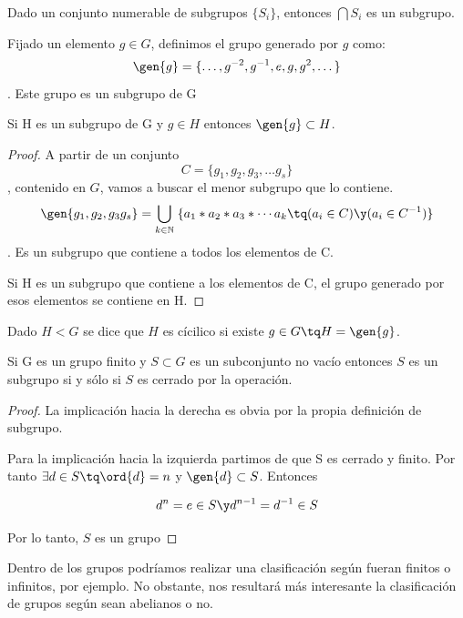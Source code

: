 \documentclass{apuntes}
\begin{document}
  \begin{theorem}
   Dado un conjunto numerable de subgrupos $\{ S_i \}$, entonces $\bigcap S_i $ es un subgrupo.
  \end{theorem}

  
  \begin{defn}
   Fijado un elemento $g \in G$, definimos el grupo generado por $g$ como:
   \[ \gen{g} =\{\dotsc, g^{-2}, g^{-1}, e, g, g^{2},\dotsc \}\]. Este grupo es un subgrupo de G
  \end{defn}

  \begin{theorem}
   Si H es un subgrupo de G y $g\in H$ entonces $\gen{g}\subset H$.   
  \end{theorem}
\begin{proof}
  A partir de un conjunto \[ C=\{g_{1}, g_{2}, g_{3}, \dotsc g_{s} \}\], contenido en $G$, vamos a buscar el menor subgrupo que lo contiene.
  \[ \gen{g_{1}, g_{2}, g_{3}g_{s}} =\bigcup_{k\in\mathbb{N}}\; \{ a_{1} \ast a_{2}\ast a_{3} \ast \dotsb  a_{k} \tq (a_{i}\in C) \y (a_{i}\in C^{-1})\} \]. Es un subgrupo que contiene a  todos los elementos de C.
  
  Si H es un subgrupo que contiene a los elementos de C, el grupo generado por esos elementos se contiene en H.
  \end{proof}
  
  \begin{defn}
   Dado $H<G$ se dice que $H$ es cícilico si existe $g\in G \tq H=\gen{g}$.
  \end{defn}

  \begin{theorem}
   Si G es un grupo finito y $S\subset G$ es un subconjunto no vacío entonces $S$ es un subgrupo si y sólo si $S$ es cerrado por la operación.   
  \end{theorem}
  
  \begin{proof}
   La implicación hacia la derecha es obvia por la propia definición de subgrupo.
   
   Para la implicación hacia la izquierda partimos de que S es cerrado y finito. Por tanto $\exists d \in S \tq \ord{d}=n$ y $\gen{d} \subset S$. Entonces
   
\[ d^{n}=e\in S \y d^{n-1}=d^{-1}\in S\]

Por lo tanto, $S$ es un grupo
  \end{proof}

  Dentro de los grupos podríamos realizar una clasificación según fueran finitos o infinitos, por ejemplo. No obstante, nos resultará
  más interesante la clasificación de grupos según sean abelianos o no.
  
\end{document}
